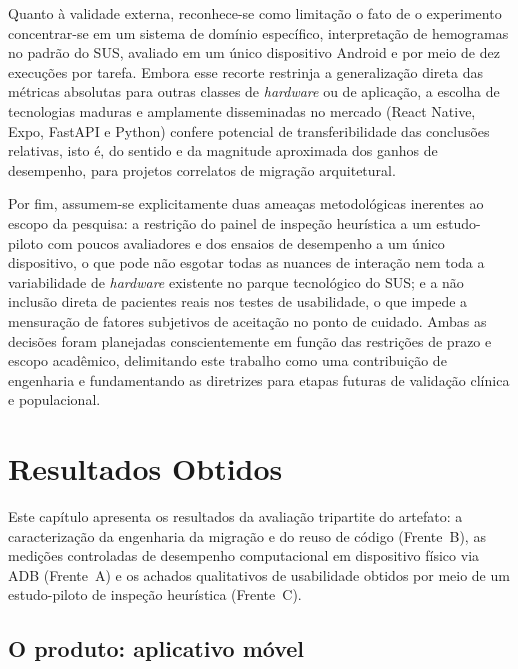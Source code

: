 \documentclass[12pt]{article}
\begin{document}
Quanto à validade externa, reconhece-se como limitação o fato de o experimento concentrar-se em um sistema de domínio específico, interpretação de hemogramas no padrão do SUS, avaliado em um único dispositivo Android e por meio de dez execuções por tarefa. Embora esse recorte restrinja a generalização direta das métricas absolutas para outras classes de \emph{hardware} ou de aplicação, a escolha de tecnologias maduras e amplamente disseminadas no mercado (React Native, Expo, FastAPI e Python) confere potencial de transferibilidade das conclusões relativas, isto é, do sentido e da magnitude aproximada dos ganhos de desempenho, para projetos correlatos de migração arquitetural.

Por fim, assumem-se explicitamente duas ameaças metodológicas inerentes ao escopo da pesquisa: a restrição do painel de inspeção heurística a um estudo-piloto com poucos avaliadores e dos ensaios de desempenho a um único dispositivo, o que pode não esgotar todas as nuances de interação nem toda a variabilidade de \emph{hardware} existente no parque tecnológico do SUS; e a não inclusão direta de pacientes reais nos testes de usabilidade, o que impede a mensuração de fatores subjetivos de aceitação no ponto de cuidado. Ambas as decisões foram planejadas conscientemente em função das restrições de prazo e escopo acadêmico, delimitando este trabalho como uma contribuição de engenharia e fundamentando as diretrizes para etapas futuras de validação clínica e populacional.


\section{Resultados Obtidos}
\label{sec:resultados}

Este capítulo apresenta os resultados da avaliação tripartite do artefato: a
caracterização da engenharia da migração e do reuso de código (Frente~B), as
medições controladas de desempenho computacional em dispositivo físico via ADB
(Frente~A) e os achados qualitativos de usabilidade obtidos por meio de um
estudo-piloto de inspeção heurística (Frente~C).

\subsection{O produto: aplicativo móvel}
\label{sub:produto}
\end{document}
